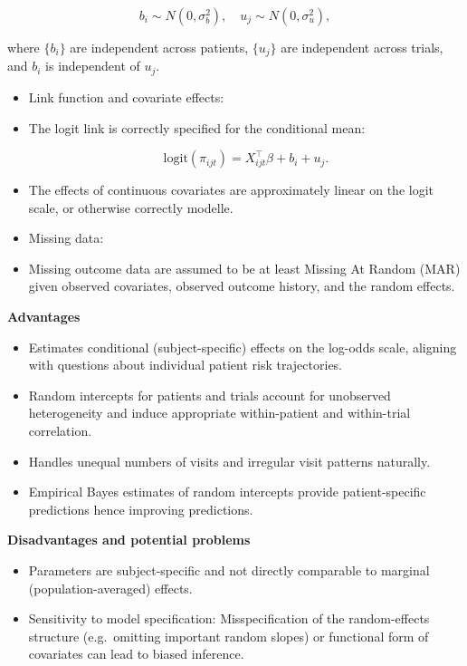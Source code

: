 \documentclass[
  11pt,
  letterpaper,
  DIV=11,
  numbers=noendperiod]{scrartcl}
\providecommand{\tightlist}{%
  \setlength{\itemsep}{0pt}\setlength{\parskip}{0pt}}\usepackage{longtable,booktabs,array}
\begin{document}
\[
b_i \sim N(0, \sigma_b^2), 
\quad
u_j \sim N(0, \sigma_u^2),
\]

where \(\{b_i\}\) are independent across patients, \(\{u_j\}\) are
independent across trials, and \(b_i\) is independent of \(u_j\).

\begin{itemize}
\item
  Link function and covariate effects:
\item
  The logit link is correctly specified for the conditional mean:

  \[
  \mathrm{logit}(\pi_{ijt}) = X_{ijt}^\top \beta + b_i + u_j.
  \]
\item
  The effects of continuous covariates are approximately linear on the
  logit scale, or otherwise correctly modelle.
\item
  Missing data:
\item
  Missing outcome data are assumed to be at least Missing At Random
  (MAR) given observed covariates, observed outcome history, and the
  random effects.
\end{itemize}

\textbf{Advantages}

\begin{itemize}
\tightlist
\item
  Estimates conditional (subject-specific) effects on the log-odds
  scale, aligning with questions about individual patient risk
  trajectories.
\item
  Random intercepts for patients and trials account for unobserved
  heterogeneity and induce appropriate within-patient and within-trial
  correlation.
\item
  Handles unequal numbers of visits and irregular visit patterns
  naturally.
\item
  Empirical Bayes estimates of random intercepts provide
  patient-specific predictions hence improving predictions.
\end{itemize}

\textbf{Disadvantages and potential problems}

\begin{itemize}
\tightlist
\item
  Parameters are subject-specific and not directly comparable to
  marginal (population-averaged) effects.
\item
  Sensitivity to model specification: Misspecification of the
  random-effects structure (e.g.~omitting important random slopes) or
  functional form of covariates can lead to biased inference.
\end{itemize}
\end{document}
